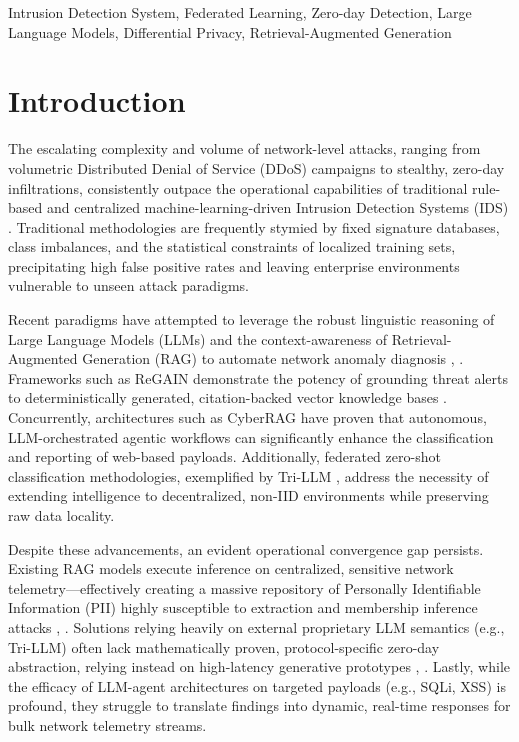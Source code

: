 \documentclass[conference]{IEEEtran}
\begin{document}
\begin{IEEEkeywords}
Intrusion Detection System, Federated Learning, Zero-day Detection, Large Language Models, Differential Privacy, Retrieval-Augmented Generation
\end{IEEEkeywords}

\section{Introduction}
The escalating complexity and volume of network-level attacks, ranging from volumetric Distributed Denial of Service (DDoS) campaigns to stealthy, zero-day infiltrations, consistently outpace the operational capabilities of traditional rule-based and centralized machine-learning-driven Intrusion Detection Systems (IDS) \cite{ref1TriLLM}. Traditional methodologies are frequently stymied by fixed signature databases, class imbalances, and the statistical constraints of localized training sets, precipitating high false positive rates and leaving enterprise environments vulnerable to unseen attack paradigms.

Recent paradigms have attempted to leverage the robust linguistic reasoning of Large Language Models (LLMs) and the context-awareness of Retrieval-Augmented Generation (RAG) to automate network anomaly diagnosis \cite{ref2ReGAIN}, \cite{ref3CyberRAG}. Frameworks such as ReGAIN demonstrate the potency of grounding threat alerts to deterministically generated, citation-backed vector knowledge bases \cite{ref2ReGAIN}. Concurrently, architectures such as CyberRAG \cite{ref3CyberRAG} have proven that autonomous, LLM-orchestrated agentic workflows can significantly enhance the classification and reporting of web-based payloads. Additionally, federated zero-shot classification methodologies, exemplified by Tri-LLM \cite{ref1TriLLM}, address the necessity of extending intelligence to decentralized, non-IID environments while preserving raw data locality.

Despite these advancements, an evident operational convergence gap persists. Existing RAG models execute inference on centralized, sensitive network telemetry---effectively creating a massive repository of Personally Identifiable Information (PII) highly susceptible to extraction and membership inference attacks \cite{ref7Huang}, \cite{ref9Lin}. Solutions relying heavily on external proprietary LLM semantics (e.g., Tri-LLM) often lack mathematically proven, protocol-specific zero-day abstraction, relying instead on high-latency generative prototypes \cite{ref1TriLLM}, \cite{ref5Wu}. Lastly, while the efficacy of LLM-agent architectures on targeted payloads (e.g., SQLi, XSS) is profound, they struggle to translate findings into dynamic, real-time responses for bulk network telemetry streams.
\end{document}
